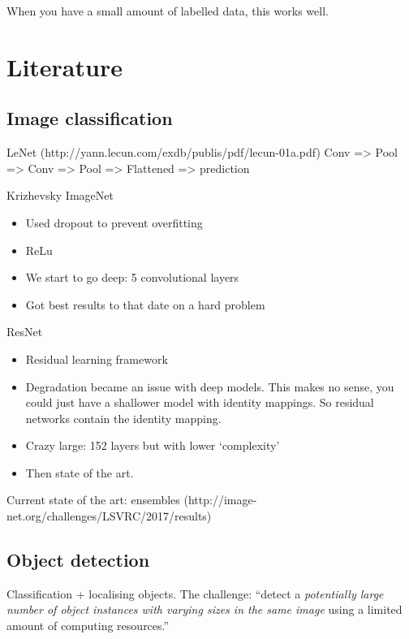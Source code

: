 \documentclass[12pt, a4paper, oneside, headinclude, footinclude]{article}
\begin{document}
When you have a small amount of labelled data, this works well.

\section{Literature}

\subsection{Image classification}

LeNet (http://yann.lecun.com/exdb/publis/pdf/lecun-01a.pdf)
Conv => Pool => Conv => Pool => Flattened => prediction

Krizhevsky ImageNet~\cite{NIPS2012_4824}
\begin{itemize}
    \item Used dropout to prevent overfitting
    \item ReLu
    \item We start to go deep: 5 convolutional layers
    \item Got best results to that date on a hard problem
\end{itemize}

ResNet~\cite{he2016deep}

\begin{itemize}
    \item Residual learning framework
    \item Degradation became an issue with deep models. This makes no sense,
        you could just have a shallower model with identity mappings. So
        residual networks contain the identity mapping.
    \item Crazy large: 152 layers but with lower `complexity'
    \item Then state of the art.
\end{itemize}

Current state of the art: ensembles
(http://image-net.org/challenges/LSVRC/2017/results)

\subsection{Object detection}

Classification + localising objects. The challenge: ``detect a \textit{potentially large
number of object instances with varying sizes in the same image} using a
limited amount of computing resources.''~\cite[Their emphasis]{NIPS2013_5207}
\end{document}
